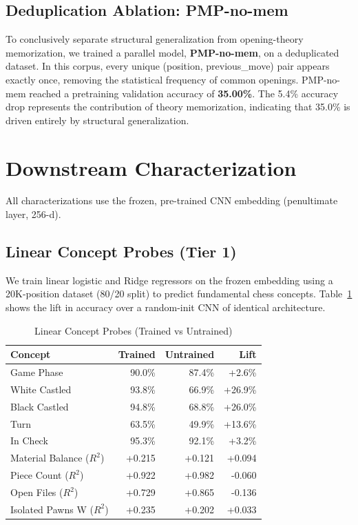 \documentclass[journal]{IEEEtran}
\begin{document}
\subsection{Deduplication Ablation: PMP-no-mem}
To conclusively separate structural generalization from opening-theory memorization, we trained a parallel model, \textbf{PMP-no-mem}, on a deduplicated dataset. In this corpus, every unique (position, previous\_move) pair appears exactly once, removing the statistical frequency of common openings. PMP-no-mem reached a pretraining validation accuracy of \textbf{35.00\%}. The 5.4\% accuracy drop represents the contribution of theory memorization, indicating that 35.0\% is driven entirely by structural generalization.

\section{Downstream Characterization}
\label{sec:eval}

All characterizations use the frozen, pre-trained CNN embedding (penultimate layer, 256-d).

\subsection{Linear Concept Probes (Tier 1)}
We train linear logistic and Ridge regressors on the frozen embedding using a 20K-position dataset (80/20 split) to predict fundamental chess concepts. Table~\ref{tab:linear_probes} shows the lift in accuracy over a random-init CNN of identical architecture.

\begin{table}[h]
\caption{Linear Concept Probes (Trained vs Untrained)}
\label{tab:linear_probes}
\centering
\begin{tabular}{lrrr}
\toprule
Concept & Trained & Untrained & Lift \\
\midrule
Game Phase & 90.0\% & 87.4\% & +2.6\% \\
White Castled & 93.8\% & 66.9\% & +26.9\% \\
Black Castled & 94.8\% & 68.8\% & +26.0\% \\
Turn & 63.5\% & 49.9\% & +13.6\% \\
In Check & 95.3\% & 92.1\% & +3.2\% \\
Material Balance ($R^2$) & +0.215 & +0.121 & +0.094 \\
Piece Count ($R^2$) & +0.922 & +0.982 & -0.060 \\
Open Files ($R^2$) & +0.729 & +0.865 & -0.136 \\
Isolated Pawns W ($R^2$) & +0.235 & +0.202 & +0.033 \\
\bottomrule
\end{tabular}
\end{table}
\end{document}
